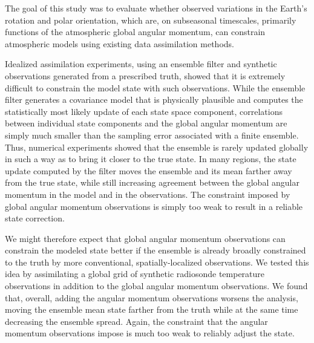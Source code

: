 
The goal of this study was to evaluate whether observed variations in the Earth's rotation and polar orientation, which are, on subseasonal timescales, primarily functions of the atmospheric global angular momentum, can constrain atmospheric models using existing data assimilation methods. 

Idealized assimilation experiments, using an ensemble filter and synthetic observations generated from a prescribed truth, showed that it is extremely difficult to constrain the model state with such observations.  
While the ensemble filter generates a covariance model that is physically plausible and computes the statistically most likely update of each state space component, correlations between individual state components and the global angular momentum are simply much smaller than the sampling error associated with a finite ensemble. 
Thus, numerical experiments showed that the ensemble is rarely updated globally in such a way as to bring it closer to the true state. 
In many regions, the state update computed by the filter moves the ensemble and its mean farther away from the true state, while still increasing agreement between the global angular momentum in the model and in the observations. 
The constraint imposed by global angular momentum observations is simply too weak to result in a reliable state correction. 

We might therefore expect that global angular momentum observations can constrain the modeled state better if the ensemble is already broadly constrained to the truth by more conventional, spatially-localized observations. 
We tested this idea by assimilating a global grid of synthetic radiosonde temperature observations in addition to the global angular momentum observations. 
We found that, overall, adding the angular momentum observations worsens the analysis, moving the ensemble mean state farther from the truth while at the same time decreasing the ensemble spread.
Again, the constraint that the angular momentum observations impose is much too weak to reliably adjust the state.


